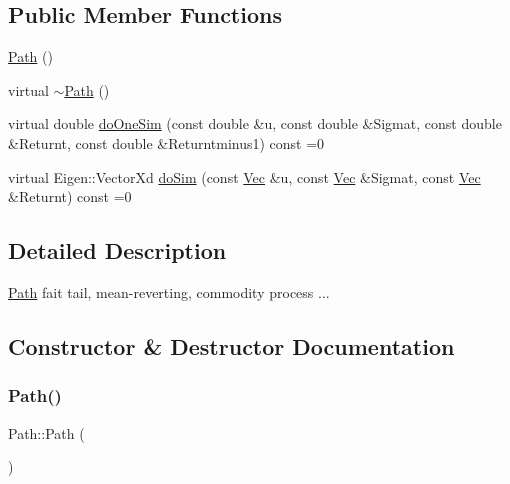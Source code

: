 \subsection*{Public Member Functions}
\begin{DoxyCompactItemize}
\item 
\hyperlink{classPath_af26cfab021ddf49af73da3b2beca85ac}{Path} ()
\item 
virtual \hyperlink{classPath_a11618e66fc700531d3ad998acfdb88a3}{$\sim$\+Path} ()
\item 
virtual double \hyperlink{classPath_a6e75e5a329c48cafecd03a355f90b694}{do\+One\+Sim} (const double \&u, const double \&Sigmat, const double \&Returnt, const double \&Returntminus1) const =0
\item 
virtual Eigen\+::\+Vector\+Xd \hyperlink{classPath_a8917612a585bce52dbd52b1b643a517a}{do\+Sim} (const \hyperlink{compute__returns__eigen_8h_a1eb6a9306ef406d7975f3cbf2e247777}{Vec} \&u, const \hyperlink{compute__returns__eigen_8h_a1eb6a9306ef406d7975f3cbf2e247777}{Vec} \&Sigmat, const \hyperlink{compute__returns__eigen_8h_a1eb6a9306ef406d7975f3cbf2e247777}{Vec} \&Returnt) const =0
\end{DoxyCompactItemize}


\subsection{Detailed Description}
\hyperlink{classPath}{Path} fait tail, mean-\/reverting, commodity process ... 

\subsection{Constructor \& Destructor Documentation}
\hypertarget{classPath_af26cfab021ddf49af73da3b2beca85ac}{}\label{classPath_af26cfab021ddf49af73da3b2beca85ac} 
\subsubsection{\texorpdfstring{Path()}{Path()}}
{\footnotesize\ttfamily Path\+::\+Path (\begin{DoxyParamCaption}{ }\end{DoxyParamCaption})\hspace{0.3cm}{\ttfamily [inline]}}

\hypertarget{classPath_a11618e66fc700531d3ad998acfdb88a3}{}\label{classPath_a11618e66fc700531d3ad998acfdb88a3} 
